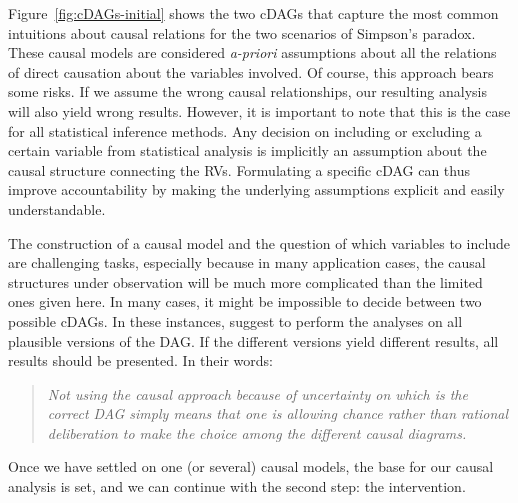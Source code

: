 \documentclass[nobib]{tufte-handout}
\begin{document}
Figure~\ref{fig:cDAGs-initial} shows the two cDAGs that capture the most common intuitions about causal relations for the two scenarios of Simpson's paradox.
These causal models are considered \textit{a-priori} assumptions about all the relations of direct causation about the variables involved.
Of course, this approach bears some risks.
If we assume the wrong causal relationships, our resulting analysis will also yield wrong results.
However, it is important to note that this is the case for all statistical inference methods.
Any decision on including or excluding a certain variable from statistical analysis is implicitly an assumption about the causal structure connecting the RVs.
Formulating a specific cDAG can thus improve accountability by making the underlying assumptions explicit and easily understandable.

The construction of a causal model and the question of which variables to include are challenging tasks, especially because in many application cases, the causal structures under observation will be much more complicated than the limited ones given here.
In many cases, it might be impossible to decide between two possible cDAGs.
In these instances, \citet{shrier2008reducing} suggest to perform the analyses on all plausible versions of the DAG.
If the different versions yield different results, all results should be presented. 
In their words: 
\begin{quote}
  \emph{Not using the causal approach because of uncertainty on which is the correct DAG simply means that one is allowing chance rather than rational deliberation to make the choice among the different causal diagrams.}
\end{quote}

Once we have settled on one (or several) causal models, the base for our causal analysis is set, and we can continue with the second step: the intervention.
\end{document}

